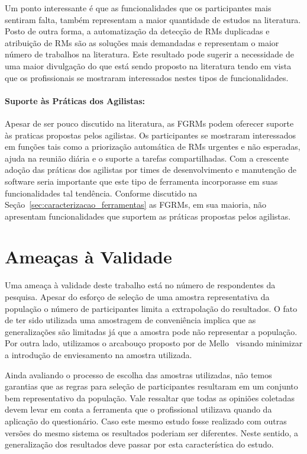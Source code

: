 Um ponto interessante é que as funcionalidades que os participantes mais
sentiram falta, também representam a maior quantidade de estudos na literatura.
Posto de outra forma, a automatização da detecção de RMs duplicadas e
atribuição de RMs são as soluções mais demandadas e representam o maior número
de trabalhos na literatura. Este resultado pode sugerir a necessidade de uma
maior divulgação do que está sendo proposto na literatura tendo em vista que os
profissionais se mostraram interessados nestes tipos de funcionalidades.

\paragraph{Suporte às Práticas dos Agilistas:}
\label{par:pesq_profissionais_suporte_pratica_agilistas}

Apesar de ser pouco discutido na literatura, as FGRMs podem oferecer suporte às
praticas propostas pelos agilistas. Os participantes se mostraram interessados
em funções tais como a priorização automática de RMs urgentes e não esperadas,
ajuda na reunião diária e o suporte a tarefas compartilhadas. Com a crescente
adoção das práticas dos agilistas por times de desenvolvimento e manutenção de
software seria importante que este tipo de ferramenta incorporasse em suas
funcionalidades tal tendência. Conforme discutido na
Seção~\ref{sec:caracterizacao_ferramentas} as FGRMs, em sua maioria, não
apresentam funcionalidades que suportem as práticas propostas pelos agilistas.

\section{Ameaças à Validade}
\label{sec:pesquisa_profissionais_ameacas_validade}

Uma ameaça à validade deste trabalho está no número de respondentes da pesquisa.
Apesar do esforço de seleção de uma amostra representativa da população o número
de participantes limita a extrapolação do resultados. O fato de ter sido
utilizada uma amostragem de conveniência implica que as generalizações são
limitadas já que a amostra pode não representar a população. Por outra lado,
utilizamos o arcabouço proposto por de Mello~\cite{de2014towards} visando
minimizar a introdução de enviesamento na amostra utilizada.

Ainda avaliando o processo de escolha das amostras utilizadas, não temos
garantias que as regras para seleção de participantes resultaram em um conjunto
bem representativo da população. Vale ressaltar que todas as opiniões coletadas
devem levar em conta a ferramenta que o profissional utilizava quando da
aplicação do questionário. Caso este mesmo estudo fosse realizado com outras
versões do mesmo sistema os resultados poderiam ser diferentes. Neste sentido, a
generalização dos resultados deve passar por esta característica do estudo.

